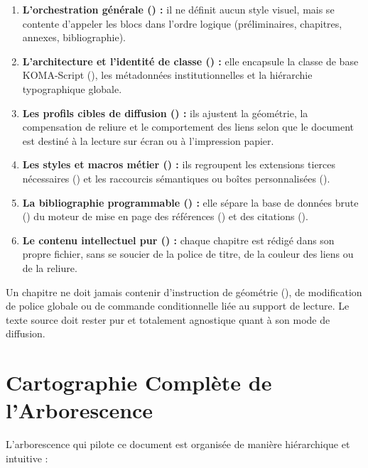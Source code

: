 \begin{enumerate}
  \item \textbf{L'orchestration générale () :}
  il ne définit aucun style visuel, mais se contente d'appeler les blocs dans l'ordre logique
  (préliminaires, chapitres, annexes, bibliographie).
  \item \textbf{L'architecture et l'identité de classe () :}
  elle encapsule la classe de base KOMA-Script (),
  les métadonnées institutionnelles et la hiérarchie typographique globale.
  \item \textbf{Les profils cibles de diffusion () :}
  ils ajustent la géométrie, la compensation de reliure et le comportement des liens
  selon que le document est destiné à la lecture sur écran ou à l'impression papier.
  \item \textbf{Les styles et macros métier () :}
  ils regroupent les extensions tierces nécessaires ()
  et les raccourcis sémantiques ou boîtes personnalisées ().
  \item \textbf{La bibliographie programmable () :}
  elle sépare la base de données brute ()
  du moteur de mise en page des références () et des citations ().
  \item \textbf{Le contenu intellectuel pur () :}
  chaque chapitre est rédigé dans son propre fichier,
  sans se soucier de la police de titre, de la couleur des liens ou de la reliure.
\end{enumerate}

\begin{callout}
Un chapitre ne doit jamais contenir d'instruction de géométrie (),
de modification de police globale ou de commande conditionnelle liée au support de lecture.
Le texte source doit rester pur et totalement agnostique quant à son mode de diffusion.
\end{callout}

\section{Cartographie Complète de l'Arborescence}
\label{sec:cartographie}

L'arborescence qui pilote ce document est organisée de manière hiérarchique et intuitive :

